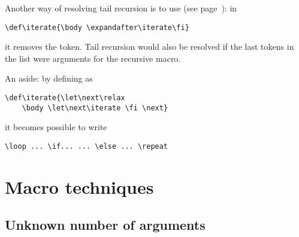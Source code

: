 \documentclass[letterpaper]{book}
\begin{document}
Another way of resolving tail recursion is to use
 (see page~\pageref{after:cond}): in
\begin{verbatim}
\def\iterate{\body \expandafter\iterate\fi}
\end{verbatim}
it removes the  token.
Tail recursion would also be resolved if the last
tokens in the list were arguments for the
recursive macro.

An aside: by defining  as
\begin{verbatim}
\def\iterate{\let\next\relax 
    \body \let\next\iterate \fi \next}
\end{verbatim}
it becomes possible to write
\begin{verbatim}
\loop ... \if... ... \else ... \repeat
\end{verbatim}

\section{Macro techniques}

\subsection{Unknown number of arguments}
\end{document}

